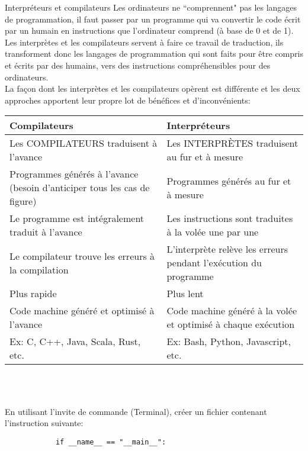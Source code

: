 \begin{section}{Interpréteurs et compilateurs}
    Les ordinateurs ne ``comprennent" pas les langages de programmation, il faut passer par un programme qui va convertir le code écrit par un humain en instructions que l'ordinateur comprend (à base de 0 et de 1).
\\
Les interprètes et les compilateurs servent à faire ce travail de traduction, ils transforment donc les langages de programmation qui sont faits pour être compris et écrits par des humains, vers des instructions compréhensibles pour des ordinateurs.
\\
La façon dont les interprètes et les compilateurs opèrent est différente et les deux approches apportent leur propre lot de bénéfices et d'inconvénients:\\
    \begin{tabular}{| C{0.45\textwidth} | C{0.45\textwidth} |} 
        \hline
        \textbf{Compilateurs} & \textbf{Interpréteurs}\\ [0.5ex]
        \hline
        Les COMPILATEURS traduisent à l'avance & Les INTERPRÈTES traduisent au fur et à mesure\\ [0.5ex] 
        \hline
        Programmes générés à l'avance (besoin d'anticiper tous les cas de figure) & Programmes générés au fur et à mesure  \\ 
        \hline
        Le programme est intégralement traduit à l'avance & Les instructions sont traduites à la volée une par une  \\
        \hline
        Le compilateur trouve les erreurs à la compilation & L'interprète relève les erreurs pendant l'exécution du programme  \\
        \hline
        Plus rapide & Plus lent \\
        \hline
        Code machine généré et optimisé à l'avance & Code machine généré à la volée et optimisé à chaque exécution  \\
        \hline
        Ex: C, C++, Java, Scala, Rust, etc. & Ex: Bash, Python, Javascript, etc. \\
        \hline
    \end{tabular}
    \\\\
    \begin{Exercice}[10 minutes]
        En utilisant l'invite de commande (Terminal), créer un fichier contenant l'instruction suivante:
        \begin{lstlisting}
            if __name__ == "__main__":

\end{lstlisting}
\end{Exercice}
\end{section}
